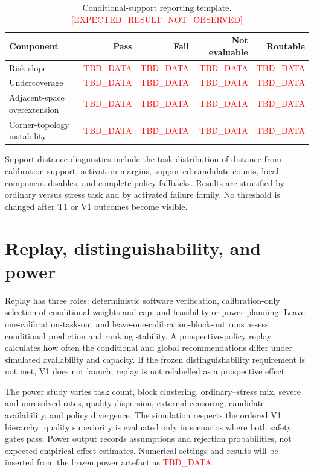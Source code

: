 \documentclass[preprint,12pt]{elsarticle}
\newcommand{\expectedresult}{\textcolor{red}{[EXPECTED\_RESULT\_NOT\_OBSERVED]}}
\newcommand{\tbddata}{\textcolor{red}{TBD\_DATA}}
\begin{document}
\begin{table}[h]
\centering
\caption{Conditional-support reporting template. \expectedresult{}}
\label{tab:supsupport}
\begin{tabular}{lrrrr}
\toprule
Component & Pass & Fail & Not evaluable & Routable \\
\midrule
Risk slope & \tbddata{} & \tbddata{} & \tbddata{} & \tbddata{} \\
Undercoverage & \tbddata{} & \tbddata{} & \tbddata{} & \tbddata{} \\
Adjacent-space overextension & \tbddata{} & \tbddata{} & \tbddata{} & \tbddata{} \\
Corner-topology instability & \tbddata{} & \tbddata{} & \tbddata{} & \tbddata{} \\
\bottomrule
\end{tabular}
\end{table}

Support-distance diagnostics include the task distribution of distance from calibration support, activation margins, supported candidate counts, local component disables, and complete policy fallbacks. Results are stratified by ordinary versus stress task and by activated failure family. No threshold is changed after T1 or V1 outcomes become visible.

\section{Replay, distinguishability, and power}
\label{sup:power}

Replay has three roles: deterministic software verification, calibration-only selection of conditional weights and cap, and feasibility or power planning. Leave-one-calibration-task-out and leave-one-calibration-block-out runs assess conditional prediction and ranking stability. A prospective-policy replay calculates how often the conditional and global recommendations differ under simulated availability and capacity. If the frozen distinguishability requirement is not met, V1 does not launch; replay is not relabelled as a prospective effect.

The power study varies task count, block clustering, ordinary--stress mix, severe and unresolved rates, quality dispersion, external censoring, candidate availability, and policy divergence. The simulation respects the ordered V1 hierarchy: quality superiority is evaluated only in scenarios where both safety gates pass. Power output records assumptions and rejection probabilities, not expected empirical effect estimates. Numerical settings and results will be inserted from the frozen power artefact as \tbddata{}.
\end{document}

